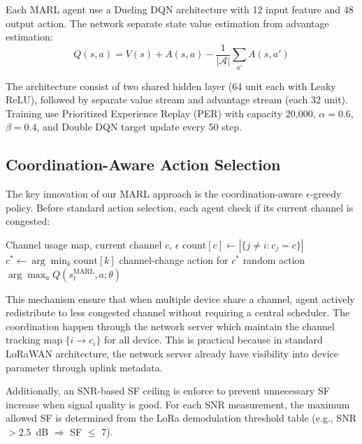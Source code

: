 \documentclass[conference]{IEEEtran}
\begin{document}
Each MARL agent use a Dueling DQN architecture \cite{wang2016dueling} with 12 input feature and 48 output action. The network separate state value estimation from advantage estimation:
\begin{equation}
    Q(s, a) = V(s) + A(s, a) - \frac{1}{|\mathcal{A}|}\sum_{a'} A(s, a')
\end{equation}

The architecture consist of two shared hidden layer (64 unit each with Leaky ReLU), followed by separate value stream and advantage stream (each 32 unit). Training use Prioritized Experience Replay (PER) \cite{schaul2016per} with capacity 20,000, $\alpha = 0.6$, $\beta = 0.4$, and Double DQN target update \cite{van2016deep} every 50 step.

\subsection{Coordination-Aware Action Selection}

The key innovation of our MARL approach is the coordination-aware $\epsilon$-greedy policy. Before standard action selection, each agent check if its current channel is congested:

\begin{algorithm}[t]
\caption{MARL Coordination-Aware Action Selection}
\label{alg:marl}
\begin{algorithmic}[1]
\Require Channel usage map, current channel $c$, $\epsilon$
\State $\text{count}[c] \gets |\{j \neq i : c_j = c\}|$
    \State $c^* \gets \arg\min_k \text{count}[k]$
    \State \Return channel-change action for $c^*$
\EndIf
{}
    \State \Return random action
\Else
    \State \Return $\arg\max_a Q(s_t^{\text{MARL}}, a; \theta)$
\EndIf
\end{algorithmic}
\end{algorithm}

This mechanism ensure that when multiple device share a channel, agent actively redistribute to less congested channel without requiring a central scheduler. The coordination happen through the network server which maintain the channel tracking map $\{i \to c_i\}$ for all device. This is practical because in standard LoRaWAN architecture, the network server already have visibility into device parameter through uplink metadata.

Additionally, an SNR-based SF ceiling is enforce to prevent unnecessary SF increase when signal quality is good. For each SNR measurement, the maximum allowed SF is determined from the LoRa demodulation threshold table (e.g., SNR $> 2.5$~dB $\Rightarrow$ SF $\leq$ 7).
\end{document}
